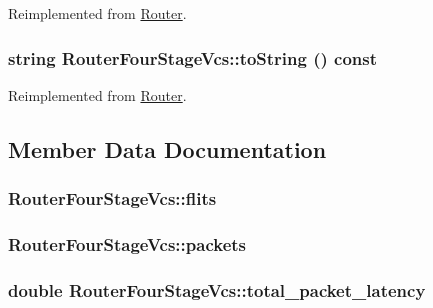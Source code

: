 Reimplemented from \hyperlink{classRouter_1e749a51dcf6cbd6925ac677473c7f58}{Router}.\hypertarget{classRouterFourStageVcs_0f2d0c3bcd780832ec371374eb3950fd}{
\subsubsection[{toString}]{\setlength{\rightskip}{0pt plus 5cm}string RouterFourStageVcs::toString () const}}
\label{classRouterFourStageVcs_0f2d0c3bcd780832ec371374eb3950fd}




Reimplemented from \hyperlink{classRouter_1e749a51dcf6cbd6925ac677473c7f58}{Router}.

\subsection{Member Data Documentation}
\hypertarget{classRouterFourStageVcs_0a012c5ae87d8e9bc3fe769b8b8c1c46}{
\subsubsection[{flits}]{ {\bf RouterFourStageVcs::flits}}}
\label{classRouterFourStageVcs_0a012c5ae87d8e9bc3fe769b8b8c1c46}


\hypertarget{classRouterFourStageVcs_1e53bbb456e2c8eb52e390ef02be6a6f}{
\subsubsection[{packets}]{ {\bf RouterFourStageVcs::packets}}}
\label{classRouterFourStageVcs_1e53bbb456e2c8eb52e390ef02be6a6f}


\hypertarget{classRouterFourStageVcs_cbb2aaae4a28ad865be0f360d6a8e95f}{
\subsubsection[{total\_\-packet\_\-latency}]{\setlength{\rightskip}{0pt plus 5cm}double {\bf RouterFourStageVcs::total\_\-packet\_\-latency}}}
\label{classRouterFourStageVcs_cbb2aaae4a28ad865be0f360d6a8e95f}




